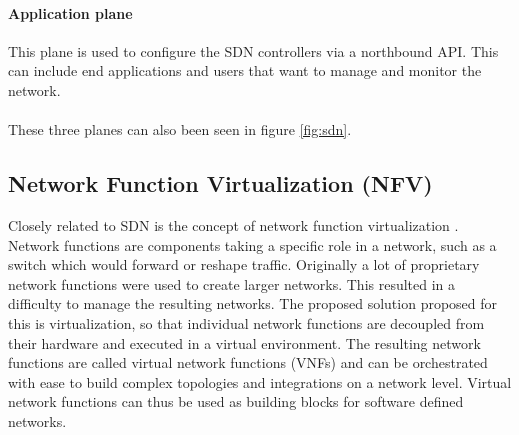 \paragraph{Application plane} This plane is used to configure the SDN controllers via a northbound API. This can include end applications and users that want to manage and monitor the network.

\paragraph{}These three planes can also been seen in figure \ref{fig:sdn}.

\subsection{Network Function Virtualization (NFV)}
Closely related to SDN is the concept of network function virtualization \cite{nfv}. Network functions are components taking a specific role in a network, such as a switch which would forward or reshape traffic. Originally a lot of proprietary network functions were used to create larger networks. This resulted in a difficulty to manage the resulting networks. The proposed solution proposed for this is virtualization, so that individual network functions are decoupled from their hardware and executed in a virtual environment. The resulting network functions are called virtual network functions (VNFs) and can be orchestrated with ease to build complex topologies and integrations on a network level. Virtual network functions can thus be used as building blocks for software defined networks.

